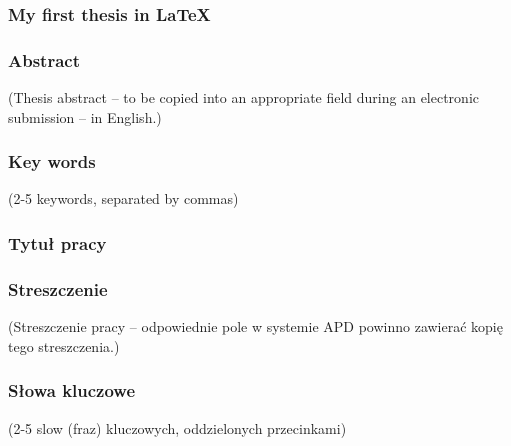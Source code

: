\subsubsection*{My first thesis in LaTeX}  
\Title

\subsubsection*{Abstract} 
(Thesis abstract – to be copied into an appropriate field during an electronic submission – in English.)

\subsubsection*{Key words}  
(2-5 keywords, separated by commas)

\subsubsection*{Tytuł pracy}
\begin{otherlanguage}{polish}
\TitleAlt
\end{otherlanguage}

\subsubsection*{Streszczenie} 
\begin{otherlanguage}{polish}
(Streszczenie pracy – odpowiednie pole w systemie APD powinno zawierać kopię tego streszczenia.)
\end{otherlanguage}

\subsubsection*{Słowa kluczowe} 
\begin{otherlanguage}{polish}
(2-5 slow (fraz) kluczowych, oddzielonych przecinkami)
\end{otherlanguage}
